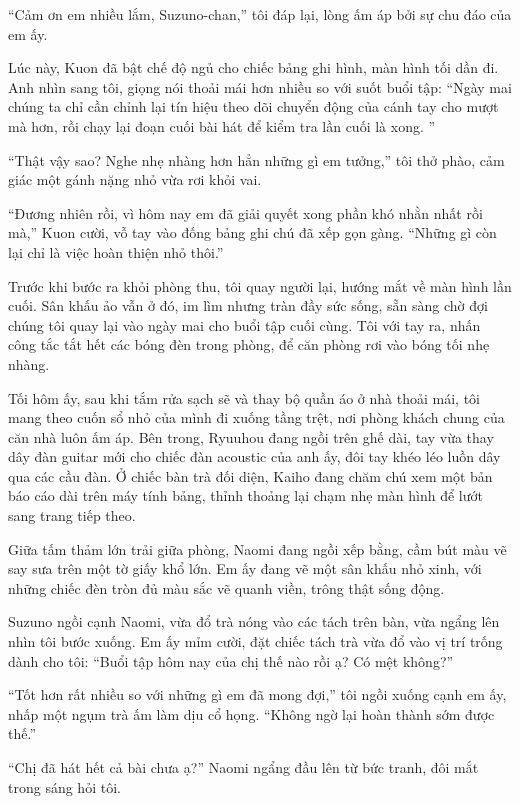 ﻿\documentclass[../main.tex]{subfiles}
\begin{document}
``Cảm ơn em nhiều lắm, Suzuno-chan,'' tôi đáp lại, lòng ấm áp bởi sự chu đáo của em ấy.

Lúc này, Kuon đã bật chế độ ngủ cho chiếc bảng ghi hình, màn hình tối dần đi. Anh nhìn sang tôi, giọng nói thoải mái hơn nhiều so với suốt buổi tập: ``Ngày mai chúng ta chỉ cần chỉnh lại tín hiệu theo dõi chuyển động của cánh tay cho mượt mà hơn, rồi chạy lại đoạn cuối bài hát để kiểm tra lần cuối là xong. ''

``Thật vậy sao? Nghe nhẹ nhàng hơn hẳn những gì em tưởng,'' tôi thở phào, cảm giác một gánh nặng nhỏ vừa rơi khỏi vai.

``Đương nhiên rồi, vì hôm nay em đã giải quyết xong phần khó nhằn nhất rồi mà,'' Kuon cười, vỗ tay vào đống bảng ghi chú đã xếp gọn gàng. ``Những gì còn lại chỉ là việc hoàn thiện nhỏ thôi.''

Trước khi bước ra khỏi phòng thu, tôi quay người lại, hướng mắt về màn hình lần cuối. Sân khấu ảo vẫn ở đó, im lìm nhưng tràn đầy sức sống, sẵn sàng chờ đợi chúng tôi quay lại vào ngày mai cho buổi tập cuối cùng. Tôi với tay ra, nhấn công tắc tắt hết các bóng đèn trong phòng, để căn phòng rơi vào bóng tối nhẹ nhàng.

\ct

Tối hôm ấy, sau khi tắm rửa sạch sẽ và thay bộ quần áo ở nhà thoải mái, tôi mang theo cuốn sổ nhỏ của mình đi xuống tầng trệt, nơi phòng khách chung của căn nhà luôn ấm áp. Bên trong, Ryuuhou đang ngồi trên ghế dài, tay vừa thay dây đàn guitar mới cho chiếc đàn acoustic của anh ấy, đôi tay khéo léo luồn dây qua các cầu đàn. Ở chiếc bàn trà đối diện, Kaiho đang chăm chú xem một bản báo cáo dài trên máy tính bảng, thỉnh thoảng lại chạm nhẹ màn hình để lướt sang trang tiếp theo.

Giữa tấm thảm lớn trải giữa phòng, Naomi đang ngồi xếp bằng, cầm bút màu vẽ say sưa trên một tờ giấy khổ lớn. Em ấy đang vẽ một sân khấu nhỏ xinh, với những chiếc đèn tròn đủ màu sắc vẽ quanh viền, trông thật sống động.

Suzuno ngồi cạnh Naomi, vừa đổ trà nóng vào các tách trên bàn, vừa ngẩng lên nhìn tôi bước xuống. Em ấy mỉm cười, đặt chiếc tách trà vừa đổ vào vị trí trống dành cho tôi: ``Buổi tập hôm nay của chị thế nào rồi ạ? Có mệt không?''

``Tốt hơn rất nhiều so với những gì em đã mong đợi,'' tôi ngồi xuống cạnh em ấy, nhấp một ngụm trà ấm làm dịu cổ họng. ``Không ngờ lại hoàn thành sớm được thế.''

``Chị đã hát hết cả bài chưa ạ?'' Naomi ngẩng đầu lên từ bức tranh, đôi mắt trong sáng hỏi tôi.
\end{document}
